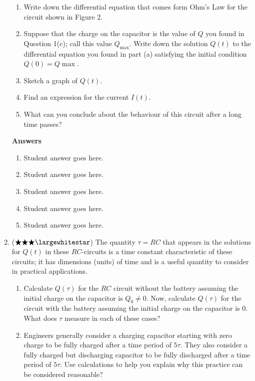 \documentclass{article}
\begin{document}
\begin{enumerate}
\begin{enumerate}

\item Write down the differential equation that comes form Ohm's Law for the circuit shown in Figure 2.

\item Suppose that the charge on the capacitor is the value of $Q$ you found in Question 1(c); call this value $Q_\max$. Write down the solution $Q(t)$ to the differential equation you found in part (a) satisfying the initial condition $Q(0)=Q\max$. 

\item Sketch a graph of $Q(t)$.

\item Find an expression for the current $I(t)$.  

\item What can you conclude about the behaviour of this circuit after a long time passes?

\end{enumerate}



\color{blue}
\textbf{Answers}
\begin{enumerate}
    \item Student answer goes here.
    \item Student answer goes here.
    \item Student answer goes here.
    \item Student answer goes here.
    \item Student answer goes here.
\end{enumerate}
\color{black}

\item ($\bigstar\bigstar\bigstar\largewhitestar$) The quantity $\tau = RC$ that appears in the solutions for $Q(t)$ in these $RC$-circuits is a time constant characteristic of these circuits; it has dimensions (units) of time and is a useful quantity to consider in practical applications.

\begin{enumerate}
    \item Calculate $Q(\tau)$ for the $RC$ circuit without the battery assuming the initial charge on the capacitor is $Q_0 \neq 0$.  Now, calculate $Q(\tau)$ for the circuit with the battery assuming the initial charge on the capacitor is 0.  What does $\tau$ measure in each of these cases?

    \item Engineers generally consider a charging capacitor starting with zero charge to be fully charged after a time period of $5\tau$.  They also consider a fully charged but discharging capacitor to be fully discharged after a time period of $5\tau$. Use calculations to help you explain why this practice can be considered reasonable?


\end{enumerate}
\end{enumerate}
\end{document}
